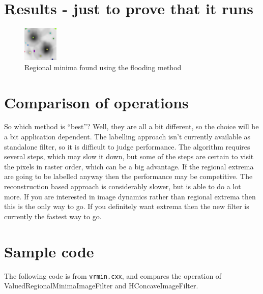 \documentclass{InsightArticle}
\begin{document}
\section{Results - just to prove that it runs}
\begin{figure}[htbp]
\begin{center}
\includegraphics[scale=3]{reg_min_ov}
\caption{Regional minima found using the flooding method}
\end{center}
\end{figure}


\section{Comparison of operations}
So which method is ``best''? Well, they are all a bit different, so
the choice will be a bit application dependent. The labelling approach
isn't currently available as standalone filter, so it is difficult to
judge performance. The algorithm requires several steps, which may
slow it down, but some of the steps are certain to visit the pixels in
raster order, which can be a big advantage. If the regional extrema
are going to be labelled anyway then the performance may be
competitive. The reconstruction based approach is considerably slower,
but is able to do a lot more. If you are interested in image dynamics
rather than regional extrema then this is the only way to go. If you
definitely want extrema then the new filter is currently the fastest
way to go.

\section{Sample code}
The following code is from {\tt vrmin.cxx}, and compares the operation
of ValuedRegionalMinimaImageFilter and HConcaveImageFilter.
\end{document}
